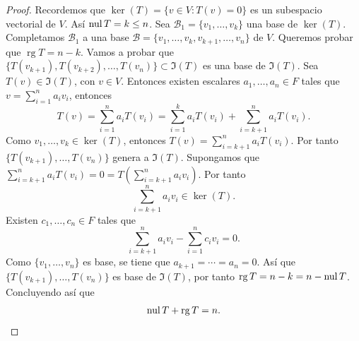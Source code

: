 \documentclass[12pt,a4paper]{book}
\DeclareMathOperator{\rg}{rg}
\newcommand{\llaves}[1]{\{#1\}}
\begin{document}
    \begin{proof}
        Recordemos que $\ker(T) = \llaves{v \in V: T(v) = 0}$ es un subespacio vectorial de $V$. Así $\operatorname{nul}{T} = k \leq n$. Sea $\mathcal{B}_1 = \llaves{v_1, \dots , v_k}$ una base de $\ker(T)$. Completamos $\mathcal{B}_1$ a una base $\mathcal{B} = \llaves{v_1, \dots,v_k, v_{k + 1}, \dots , v_n}$ de $V$. Queremos probar que $\rg{T} = n - k$. Vamos a probar que $\llaves{T(v_{k + 1}),T(v_{k + 2}), \dots, T(v_n)} \subset \Im(T)$ es una base de $\Im(T)$. Sea $T(v) \in \Im(T)$, con $v \in V$. Entonces existen escalares $a_1, \dots , a_n \in F$ tales que $v = \sum_{i = 1}^na_iv_i$, entonces
        \begin{equation*}
            T(v) = \sum_{i = 1}^n a_i T(v_i) = \sum_{i = 1}^k a_i T(v_i) + \sum_{i = k + 1}^n a_i T(v_i).
        \end{equation*}
        Como $v_1, \dots, v_k \in \ker(T)$, entonces $T(v) = \sum_{i = k + 1}^n a_i T(v_i)$. Por tanto $\llaves{T(v_{k+1}), \dots, T(v_n)}$ genera a $\Im(T)$. Supongamos que $\sum_{i = k+1}^n a_i T(v_i) = 0 = T\left(\sum_{i = k+1}^n a_i v_i\right)$. Por tanto
        \begin{equation*}
            \sum_{i = k+1}^n a_i v_i \in \ker(T).
        \end{equation*}
        Existen $c_1, \dots, c_n \in F$ tales que
        \begin{equation*}
            \sum_{i = k+1}^n a_i v_i - \sum_{i = 1}^n c_i v_i = 0.
        \end{equation*}
        Como $\llaves{v_1, \dots, v_n}$ es base, se tiene que $a_{k + 1} = \dotsi = a_n = 0$. Así que $\llaves{T(v_{k + 1}), \dots , T(v_n)}$ es base de $\Im(T)$, por tanto $\rg{T} = n - k = n - \nul{T}$. Concluyendo así que
        \begin{equation*}
            \nul{T} + \rg{T} = n.
        \end{equation*}
    \end{proof}
\end{document}
